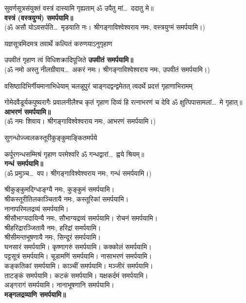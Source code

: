 \begin{center}
{सुवर्णसूत्रसंयुक्तं वस्त्रं दास्यामि गृह्यताम्}
ॐ उपैतु मां\ldots\ ददातु मे॥\\
\textbf{\devAya{} वस्त्रं (वस्त्रयुग्मं) समर्पयामि॥}\\
(ॐ असौ योऽवसर्पति\ldots\ मृडयाति नः। श्रीगङ्गाविश्वेश्वराय नमः, वस्त्रयुग्मं समर्पयामि।)


{यज्ञसूत्रमिदमत्र तवार्थे कल्पितं करुणयाऽनुगृहाण}

{उपवीतं गृहाण त्वं विधिशक्रादिपूजिते}
\textbf{\devAya{} उपवीतं समर्पयामि॥}\\
(ॐ नमो अस्तु नीलग्रीवाय\ldots\ अकरं नमः। श्रीगङ्गाविश्वेश्वराय नमः, उपवीतं समर्पयामि।)


{वसिष्ठादिभिर्गीयमानाभिधेयाम्}
{चलन्नूपुरं चाङ्गदद्वन्द्वमेतत्}
{त्वदर्थे प्रदत्तं गृहाणाभिरामम्}

{गोमेदवैडूर्यकपुष्यरागैः}
{प्रवालनीलैश्च कृतं गृहाण}
{दिव्यं हि रत्नाभरणं च देवि}
ॐ क्षुत्पिपासामलां\ldots\ मे गृहात्॥\\
\textbf{\devAya{} आभरणं समर्पयामि॥}\\
(ॐ नमः शिवाय। श्रीगङ्गाविश्वेश्वराय नमः, आभरणं समर्पयामि।)


{सुगन्धोज्ज्वलकस्तूरीकुङ्कुमाङ्कितमर्पये}

{कर्पूरगन्धसम्मिश्रं गृहाण परमेश्वरि}
ॐ गन्धद्वारां\ldots\ ह्वये श्रियम्॥\\
\textbf{\devAya{} गन्धं समर्पयामि॥}\\
(ॐ प्रमुञ्च\ldots\ वप। श्रीगङ्गाविश्वेश्वराय नमः, गन्धं समर्पयामि।)

श्रीकुङ्कुमदिग्धाङ्ग्यै नमः, कुङ्कुमं समर्पयामि।\\
श्रीकस्तूरीतिलकाञ्चितायै नमः, कस्तूरिकां समर्पयामि।\\
नानापरिमलद्रव्यं समर्पयामि।\\
श्रीसौभाग्यदायिन्यै नमः, सौभाग्यद्रव्यं समर्पयामि। रोचनं समर्पयामि।\\
श्रीहरिद्रारञ्जितायै नमः, हरिद्रां समर्पयामि।\\
श्रीसीमन्तभूषणायै नमः, सिन्दूरं समर्पयामि।\\
घनसारं समर्पयामि। कृष्णागरुं समर्पयामि। कक्कोलं समर्पयामि।\\
पट्टसूत्रं समर्पयामि। चूडामणिं समर्पयामि। नासाभरणं समर्पयामि।\\
कङ्कतिकां समर्पयामि। काञ्चीं समर्पयामि। मञ्जीरं समर्पयामि।\\
ताटङ्कं समर्पयामि। कटकं समर्पयामि। यक्षकर्दमं समर्पयामि।\\
अङ्गरागं समर्पयामि। नानाभूषणानि समर्पयामि।\\
\textbf{\devAya{} मङ्गलद्रव्याणि समर्पयामि॥}


\end{center}
